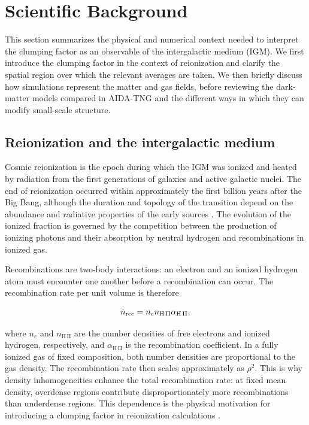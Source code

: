 
\section{Scientific Background}

This section summarizes the physical and numerical context needed to interpret the clumping factor as an observable of the intergalactic medium (IGM). We first introduce the clumping factor in the context of reionization and clarify the spatial region over which the relevant averages are taken. We then briefly discuss how simulations represent the matter and gas fields, before reviewing the dark-matter models compared in AIDA-TNG and the different ways in which they can modify small-scale structure.

\subsection{Reionization and the intergalactic medium}

Cosmic reionization is the epoch during which the IGM was ionized and heated by radiation from the first generations of galaxies and active galactic nuclei. The end of reionization occurred within approximately the first billion years after the Big Bang, although the duration and topology of the transition depend on the abundance and radiative properties of the early sources \cite{feng2019reionization}. The evolution of the ionized fraction is governed by the competition between the production of ionizing photons and their absorption by neutral hydrogen and recombinations in ionized gas.

Recombinations are two-body interactions: an electron and an ionized hydrogen atom must encounter one another before a recombination can occur. The recombination rate per unit volume is therefore

$$
\dot n_{\rm rec}=n_e n_{\mathrm{H\,II}}\alpha_{\mathrm{H\,II}},
$$

where $n_e$ and $n_{\mathrm{H\,II}}$ are the number densities of free electrons and ionized hydrogen, respectively, and $\alpha_{\mathrm{H\,II}}$ is the recombination coefficient. In a fully ionized gas of fixed composition, both number densities are proportional to the gas density. The recombination rate then scales approximately as $\rho^2$. This is why density inhomogeneities enhance the total recombination rate: at fixed mean density, overdense regions contribute disproportionately more recombinations than underdense regions. This dependence is the physical motivation for introducing a clumping factor in reionization calculations \cite{feng2019reionization,davies2024clumping}.

